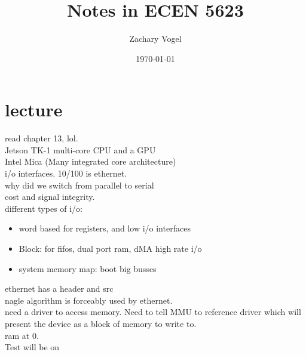 \documentclass{article}
\author{Zachary Vogel}
\date{\today}
\title{Notes in ECEN 5623}
\begin{document}
\maketitle


\section*{lecture}
read chapter 13, lol.\\

Jetson TK-1 multi-core CPU and a GPU\\
Intel Mica (Many integrated core architecture)\\

i/o interfaces. 10/100 is ethernet.\\

why did we switch from parallel to serial\\
cost and signal integrity.\\

different types of i/o:
\begin{itemize}
    \item word based for registers, and low i/o interfaces
    \item Block: for fifos, dual port ram, dMA high rate i/o
    \item system memory map: boot big busses
\end{itemize}

ethernet has a header and src\\
nagle algorithm is forceably used by ethernet.\\

need a driver to access memory. Need to tell MMU to reference driver which will present the device as a block of memory to write to.\\

ram at 0.\\


Test will be on 
\end{document}
